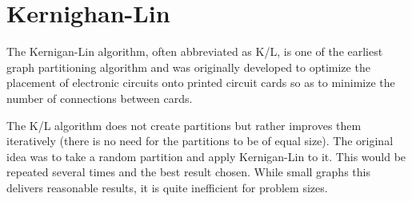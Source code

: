 
\section{Kernighan-Lin}
%
%

The Kernigan-Lin algorithm\cite{KernighanLin}, often abbreviated as K/L, is one of the earliest graph partitioning algorithm and was originally developed to optimize the placement of electronic circuits onto printed circuit cards so as to minimize the number of connections between cards.

The K/L algorithm does not create partitions but rather improves them iteratively (there is no need for the partitions to be of equal size). The original idea was to take a random partition and apply Kernigan-Lin to it. This would be repeated several times and the best result chosen. While small graphs this delivers reasonable results, it is quite inefficient for problem sizes.

